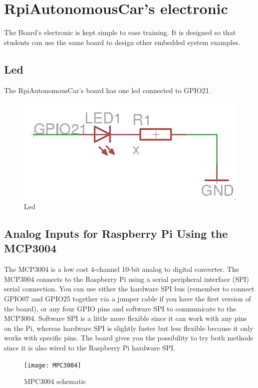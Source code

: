 \documentclass[
12pt, %
a4paper, %
oneside, %
headinclude,footinclude, %
BCOR5mm, %
table,
]{scrartcl}
\begin{document}
\section{RpiAutonomousCar's electronic}
The Board's electronic is kept simple to ease training. It is designed so that students can use the same board to design other embedded system examples.

\subsection{Led}
The RpiAutonomousCar's board has one led connected to GPIO21.

\begin{figure}[H]
\centering
\includegraphics[scale=0.45]{Figures/Led.png}
\caption{Led}
\label{Led}
\end{figure}

\subsection{Analog Inputs for Raspberry Pi Using the MCP3004}
The MCP3004 is a low cost 4-channel 10-bit analog to digital converter. The MCP3004 connects to the Raspberry Pi using a serial peripheral interface (SPI) serial connection. You can use either the hardware SPI bus (remember to connect GPIO07 and GPIO25 together via a jumper cable if you have the first version of the board), or any four GPIO pins and software SPI to communicate to the MCP3004. Software SPI is a little more flexible since it can work with any pins on the Pi, whereas hardware SPI is slightly faster but less flexible because it only works with specific pins. The board gives you the possibility to try both methods since it is also wired to the Raspberry Pi hardware SPI.

\begin{figure}[h]
\centering
\texttt{[image: MPC3004]} 
\caption[MPC3004 schematic]{MPC3004 schematic}
\label{fig:MPC3004}
\end{figure}
\end{document}
